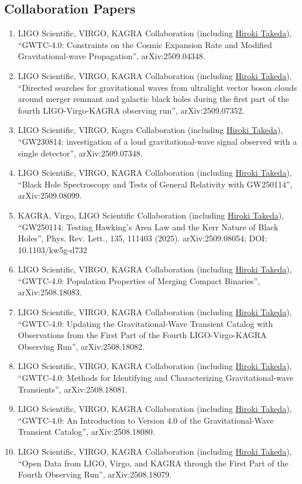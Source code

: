 \documentclass[uplatex, 12pt]{article}
\begin{document}
\subsection*{Collaboration Papers}
\begin{enumerate}
\item LIGO Scientific, VIRGO, KAGRA Collaboration (including \uline{Hiroki Takeda}), “GWTC-4.0: Constraints on the Cosmic Expansion Rate and Modified Gravitational-wave Propagation”, arXiv:2509.04348.
\item LIGO Scientific, VIRGO, KAGRA Collaboration (including \uline{Hiroki Takeda}), “Directed searches for gravitational waves from ultralight vector boson clouds around merger remnant and galactic black holes during the first part of the fourth LIGO-Virgo-KAGRA observing run”, arXiv:2509.07352.
\item LIGO Scientific, VIRGO, Kagra Collaboration (including \uline{Hiroki Takeda}), “GW230814: investigation of a loud gravitational-wave signal observed with a single detector”, arXiv:2509.07348.
\item LIGO Scientific, VIRGO, KAGRA Collaboration (including \uline{Hiroki Takeda}), “Black Hole Spectroscopy and Tests of General Relativity with GW250114”, arXiv:2509.08099.
\item KAGRA, Virgo, LIGO Scientific Collaboration (including \uline{Hiroki Takeda}), “GW250114: Testing Hawking's Area Law and the Kerr Nature of Black Holes”, Phys. Rev. Lett., 135, 111403 (2025). arXiv:2509.08054; DOI: 10.1103/kw5g-d732
\item LIGO Scientific, VIRGO, KAGRA Collaboration (including \uline{Hiroki Takeda}), “GWTC-4.0: Population Properties of Merging Compact Binaries”, arXiv:2508.18083.
\item LIGO Scientific, VIRGO, KAGRA Collaboration (including \uline{Hiroki Takeda}), “GWTC-4.0: Updating the Gravitational-Wave Transient Catalog with Observations from the First Part of the Fourth LIGO-Virgo-KAGRA Observing Run”, arXiv:2508.18082.
\item LIGO Scientific, VIRGO, KAGRA Collaboration (including \uline{Hiroki Takeda}), “GWTC-4.0: Methods for Identifying and Characterizing Gravitational-wave Transients”, arXiv:2508.18081.
\item LIGO Scientific, VIRGO, KAGRA Collaboration (including \uline{Hiroki Takeda}), “GWTC-4.0: An Introduction to Version 4.0 of the Gravitational-Wave Transient Catalog”, arXiv:2508.18080.
\item LIGO Scientific, VIRGO, KAGRA Collaboration (including \uline{Hiroki Takeda}), “Open Data from LIGO, Virgo, and KAGRA through the First Part of the Fourth Observing Run”, arXiv:2508.18079.

\end{enumerate}
\end{document}
